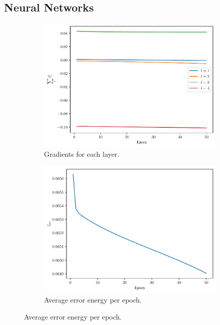 \documentclass[conference]{IEEEtran}
\theoremstyle{definition}
\theoremstyle{remark}
\theoremstyle{remark}
\begin{document}
\subsection{Neural Networks}
\begin{figure}
    \centering
    \begin{subfigure}[b]{0.32\textwidth}
        \centering
        \includegraphics[width=\textwidth]{figs/2-3-3-0.9-emb-gradients.pdf}
        \caption{Gradients for each layer.}
    \end{subfigure}
    \begin{subfigure}[b]{0.32\textwidth}
        \centering
        \includegraphics[width=\textwidth]{figs/2-3-3-0.9-emb-error.pdf}
        \caption{Average error energy per epoch.}
    \end{subfigure}

\end{figure}
\end{document}
